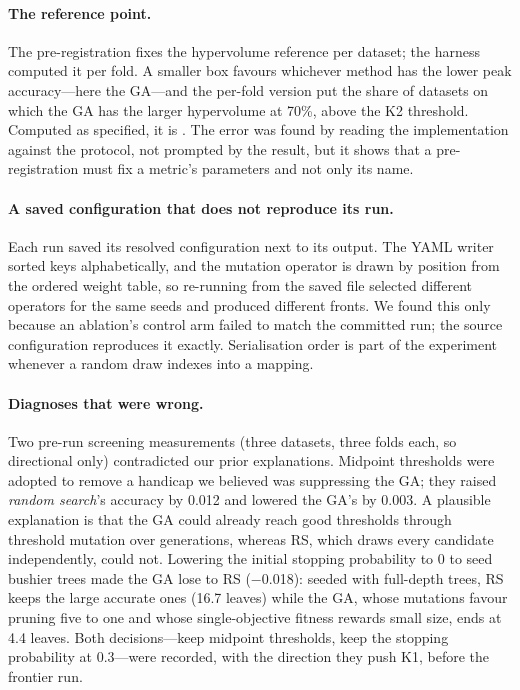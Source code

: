 \documentclass[11pt]{article}
\newcommand{\GA}{GA\xspace}
\newcommand{\RS}{RS\xspace}
\begin{document}
\paragraph{The reference point.} The pre-registration fixes the hypervolume reference per
dataset; the harness computed it per fold. A smaller box favours whichever method has the
lower peak accuracy---here the \GA---and the per-fold version put the share of datasets on
which the \GA has the larger hypervolume at 70\%, above the K2 threshold. Computed as
specified, it is \KtwoRate. The error was found by reading the implementation against the
protocol, not prompted by the result, but it shows that a pre-registration must fix a
metric's parameters and not only its name.

\paragraph{A saved configuration that does not reproduce its run.} Each run saved its
resolved configuration next to its output. The YAML writer sorted keys alphabetically,
and the mutation operator is drawn by position from the ordered weight table, so
re-running from the saved file selected different operators for the same seeds and
produced different fronts. We found this only because an ablation's control arm failed to
match the committed run; the source configuration reproduces it exactly. Serialisation
order is part of the experiment whenever a random draw indexes into a mapping.

\paragraph{Diagnoses that were wrong.} Two pre-run screening measurements (three
datasets, three folds each, so directional only) contradicted our prior explanations.
Midpoint thresholds were adopted to remove a handicap we believed was suppressing the
\GA; they raised \emph{random search}'s accuracy by 0.012 and lowered the \GA's by 0.003.
A plausible explanation is that the \GA could already reach good thresholds through
threshold mutation over generations, whereas \RS, which draws every candidate
independently, could not. Lowering the initial stopping probability to 0 to seed bushier
trees made the \GA lose to \RS{} ($-$0.018): seeded with full-depth trees, \RS{} keeps the
large accurate ones (16.7 leaves) while the \GA, whose mutations favour pruning five to
one and whose single-objective fitness rewards small size, ends at 4.4 leaves. Both
decisions---keep midpoint thresholds, keep the stopping probability at 0.3---were
recorded, with the direction they push K1, before the frontier run.
\end{document}
